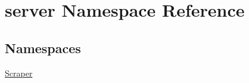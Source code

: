 \hypertarget{namespaceserver}{}\section{server Namespace Reference}
\label{namespaceserver}
\subsection*{Namespaces}
\begin{DoxyCompactItemize}
\item 
 \mbox{\hyperlink{namespaceserver_1_1_scraper}{Scraper}}
\end{DoxyCompactItemize}
